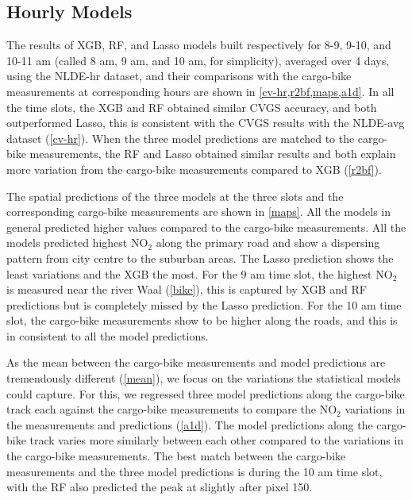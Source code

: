 \documentclass{article}
\begin{document}
 
\subsection{Hourly Models}
The results of XGB, RF, and Lasso models built respectively for 8-9, 9-10, and 10-11 am (called 8 am, 9 am, and 10 am, for simplicity), averaged over 4 days, using the NLDE-hr dataset, and their comparisons with the cargo-bike measurements at corresponding hours are shown in \cref{cv-hr,r2bf,maps,a1d}. In all the time slots, the XGB and RF obtained similar CVGS accuracy, and both outperformed Lasso, this is consistent with the CVGS results with the NLDE-avg dataset (\cref{cv-hr}). When the three model predictions are matched to the cargo-bike measurements, the RF and Lasso obtained similar results and both explain more variation from the cargo-bike measurements compared to XGB (\cref{r2bf}).  
 
 The spatial predictions of the three models at the three slots and the corresponding cargo-bike measurements are shown in \cref{maps}. All the models in general predicted higher values compared to the cargo-bike measurements. All the models predicted highest NO$_2$ along the primary road and show a dispersing pattern from city centre to the suburban areas. The Lasso prediction shows the least variations and the XGB the most. For the 9 am time slot, the highest NO$_2$ is measured near the river Waal (\cref{bike}), this is captured by XGB and RF predictions but is completely missed by the Lasso prediction. For the 10 am time slot, the cargo-bike measurements show to be higher along the roads, and this is in consistent to all the model predictions.  
 
 As the mean between the cargo-bike measurements and model predictions are tremendously different (\cref{mean}), we focus on the variations the statistical models could capture. For this, we regressed three model predictions along the cargo-bike track each against the cargo-bike measurements to compare the NO$_2$ variations in the measurements and predictions (\cref{a1d}). The model predictions along the cargo-bike track varies more similarly between each other compared to the variations in the cargo-bike measurements. The best match between the cargo-bike measurements and the three model predictions is during the 10 am time slot, with the RF also predicted the peak at slightly after pixel 150.  
 
\end{document}
